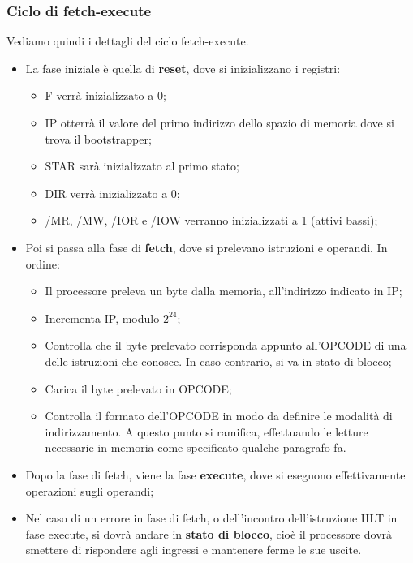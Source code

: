 \documentclass[a4paper,11pt]{article}
\begin{document}
\subsubsection{Ciclo di fetch-execute}
Vediamo quindi i dettagli del ciclo fetch-execute.
\begin{itemize}
	\item La fase iniziale è quella di \textbf{reset}, dove si inizializzano i registri:
		\begin{itemize}
			\item F verrà inizializzato a 0;
			\item IP otterrà il valore del primo indirizzo dello spazio di memoria dove si trova il bootstrapper;
			\item STAR sarà inizializzato al primo stato;
			\item DIR verrà inizializzato a 0;
			\item /MR, /MW, /IOR e /IOW verranno inizializzati a 1 (attivi bassi);
		\end{itemize}
	\item Poi si passa alla fase di \textbf{fetch}, dove si prelevano istruzioni e operandi. In ordine:
		\begin{itemize}
			\item Il processore preleva un byte dalla memoria, all'indirizzo indicato in IP;
			\item Incrementa IP, modulo $2^24$;
			\item Controlla che il byte prelevato corrisponda appunto all'OPCODE di una delle istruzioni che conosce.
				In caso contrario, si va in stato di blocco;
			\item Carica il byte prelevato in OPCODE;
			\item Controlla il formato dell'OPCODE in modo da definire le modalità di indirizzamento.
				A questo punto si ramifica, effettuando le letture necessarie in memoria come specificato qualche paragrafo fa. 
		\end{itemize}
	\item Dopo la fase di fetch, viene la fase \textbf{execute}, dove si eseguono effettivamente operazioni sugli operandi;
	\item Nel caso di un errore in fase di fetch, o dell'incontro dell'istruzione HLT in fase execute, si dovrà andare in \textbf{stato di blocco}, cioè il processore dovrà smettere di rispondere agli ingressi e mantenere ferme le sue uscite.
\end{itemize}
\end{document}
